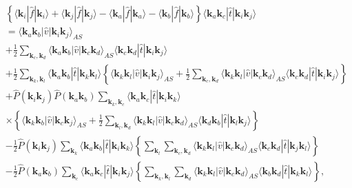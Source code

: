 \documentclass[a4paper,12pt]{report}
\begin{document}
\begin{align} \label{eq:t2ampl}
  & \left\{ \langle \mathbf{k}_{i}|\hat{f}|\mathbf{k}_{i}\rangle +
  \langle \mathbf{k}_{j}|\hat{f}|\mathbf{k}_{j}\rangle -
  \langle \mathbf{k}_{a}|\hat{f}|\mathbf{k}_{a}\rangle -
  \langle \mathbf{k}_{b}|\hat{f}|\mathbf{k}_{b}\rangle
  \right\} \langle \mathbf{k}_{a}\mathbf{k}_{c}|\hat{t}|\mathbf{k}_{i}\mathbf{k}_{j}\rangle \nonumber \\
  &= \langle \mathbf{k}_{a}\mathbf{k}_{b}|\hat{v}|\mathbf{k}_{i}\mathbf{k}_{j}\rangle_{AS} \nonumber \\
  & + \frac{1}{2}\sum_{\mathbf{k}_{c},\mathbf{k}_{d}}\langle \mathbf{k}_{a}\mathbf{k}_{b}|\hat{v}|\mathbf{k}_{c}\mathbf{k}_{d}\rangle_{AS}\langle \mathbf{k}_{c}\mathbf{k}_{d}|\hat{t}|\mathbf{k}_{i}\mathbf{k}_{j}\rangle \nonumber \\
  & + \frac{1}{2}\sum_{\mathbf{k}_{k},\mathbf{k}_{l}} \langle \mathbf{k}_{a}\mathbf{k}_{b}|\hat{t}|\mathbf{k}_{k}\mathbf{k}_{l}\rangle \left\{ \langle \mathbf{k}_{k}\mathbf{k}_{l}|\hat{v}|\mathbf{k}_{i}\mathbf{k}_{j}\rangle_{AS} 
+ \frac{1}{2}\sum_{\mathbf{k}_{c},\mathbf{k}_{d}} \langle \mathbf{k}_{k}\mathbf{k}_{l}|\hat{v}|\mathbf{k}_{c}\mathbf{k}_{d}\rangle_{AS} \langle \mathbf{k}_{c}\mathbf{k}_{d}|\hat{t}|\mathbf{k}_{i}\mathbf{k}_{j}\rangle \right\} \nonumber \\ %
  & + \hat{P}(\mathbf{k}_{i}\mathbf{k}_{j})\hat{P}(\mathbf{k}_{a}\mathbf{k}_{b})\sum_{\mathbf{k}_{k},\mathbf{k}_{c}}\langle \mathbf{k}_{a}\mathbf{k}_{c}|\hat{t}|\mathbf{k}_{i}\mathbf{k}_{k}\rangle \nonumber \\
    & \times \left\{ \langle \mathbf{k}_{k}\mathbf{k}_{b}|\hat{v}|\mathbf{k}_{c}\mathbf{k}_{j}\rangle_{AS} + \frac{1}{2} \sum_{\mathbf{k}_{l},\mathbf{k}_{d}}
\langle \mathbf{k}_{k}\mathbf{k}_{l}|\hat{v}|\mathbf{k}_{c}\mathbf{k}_{d}\rangle_{AS}
\langle \mathbf{k}_{d}\mathbf{k}_{b}|\hat{t}|\mathbf{k}_{l}\mathbf{k}_{j}\rangle
\right\} \nonumber \\
& - \frac{1}{2}\hat{P}(\mathbf{k}_{i}\mathbf{k}_{j})\sum_{\mathbf{k}_{k}} 
\langle \mathbf{k}_{a}\mathbf{k}_{b}|\hat{t}|\mathbf{k}_{i}\mathbf{k}_{k}\rangle
\left\{ \sum_{\mathbf{k}_{l}}\sum_{\mathbf{k}_{c},\mathbf{k}_{d}} 
\langle \mathbf{k}_{k}\mathbf{k}_{l}|\hat{v}|\mathbf{k}_{c}\mathbf{k}_{d}\rangle_{AS}
\langle \mathbf{k}_{c}\mathbf{k}_{d}|\hat{t}|\mathbf{k}_{j}\mathbf{k}_{l}\rangle
\right\} \nonumber \\
& - \frac{1}{2}\hat{P}(\mathbf{k}_{a}\mathbf{k}_{b})\sum_{\mathbf{k}_{c}}
\langle \mathbf{k}_{a}\mathbf{k}_{c}|\hat{t}|\mathbf{k}_{i}\mathbf{k}_{j}\rangle
\left\{ \sum_{\mathbf{k}_{k},\mathbf{k}_{l}}\sum_{\mathbf{k}_{d}}
\langle \mathbf{k}_{k}\mathbf{k}_{l}|\hat{v}|\mathbf{k}_{c}\mathbf{k}_{d}\rangle_{AS}
\langle \mathbf{k}_{b}\mathbf{k}_{d}|\hat{t}|\mathbf{k}_{k}\mathbf{k}_{l}\rangle
\right\} ,
  \end{align}
\end{document}

